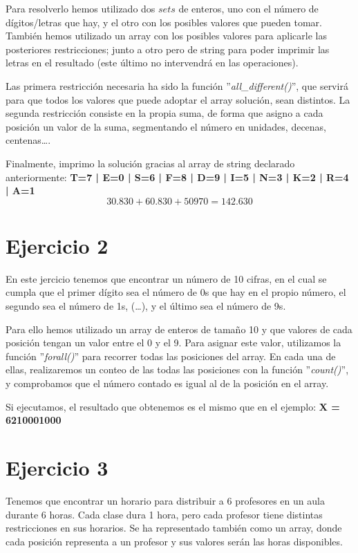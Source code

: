 \documentclass[11pt,a4paper]{article}
\begin{document}
Para resolverlo hemos utilizado dos $sets$ de enteros, uno con el número de dígitos/letras que hay, y el otro con los posibles valores que pueden
tomar. También hemos utilizado un array con los posibles valores para aplicarle las posteriores restricciones; junto a otro pero de string para
poder imprimir las letras en el resultado (este último no intervendrá en las operaciones).

Las primera restricción necesaria ha sido la función ''\textit{all\_different()}'', que servirá para que todos los valores que puede adoptar el
array solución, sean distintos. La segunda restricción consiste en la propia suma, de forma que asigno a cada posición un valor de la suma,
segmentando el número en unidades, decenas, centenas\dots.

Finalmente, imprimo la solución gracias al array de string declarado anteriormente: \textbf{T=7 | E=0 | S=6 | F=8 | D=9 | I=5 | N=3 | K=2 | R=4 |
A=1}
\begin{equation*}
    30.830 + 60.830 + 50970 = 142.630
\end{equation*}



\section*{Ejercicio 2}
En este jercicio tenemos que encontrar un número de 10 cifras, en el cual se cumpla que el primer dígito sea el número de 0s que hay en el propio
número, el segundo sea el número de 1s, (\dots), y el último sea el número de 9s.

Para ello hemos utilizado un array de enteros de tamaño 10 y que valores de cada posición tengan un valor entre el 0 y el 9. Para asignar este
valor, utilizamos la función ''\textit{forall()}'' para recorrer todas las posiciones del array. En cada una de ellas, realizaremos un conteo
de las todas las posiciones con la función ''\textit{count()}'', y comprobamos que el número contado es igual al de la posición en el array.

Si ejecutamos, el resultado que obtenemos es el mismo que en el ejemplo: \textbf{X = 6210001000}



\section*{Ejercicio 3}
Tenemos que encontrar un horario para distribuir a 6 profesores en un aula durante 6 horas. Cada clase dura 1 hora, pero cada profesor tiene
distintas restricciones en sus horarios. Se ha representado también como un array, donde cada posición representa a un profesor y sus valores
serán las horas disponibles.
\end{document}
